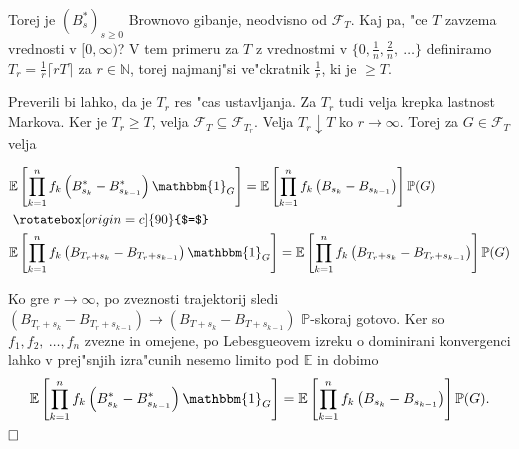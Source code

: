 \documentclass[twoside,11pt]{article}
\begin{document}
\begin{dokaz}
\begin{enumerate}
    \end{enumerate}
    Torej je $(B^*_s)_{s\geq0}$ Brownovo gibanje, neodvisno od $\mathcal{F}_T$.
    \noindent
    Kaj pa, "ce $T$ zavzema vrednosti v $[0, \infty)$? V tem primeru za $T$ z vrednostmi v $\{0, \tfrac{1}{n}, \tfrac{2}{n}, \ \ldots \}$
    definiramo $T_r = \tfrac{1}{r}\lceil rT\rceil$ za $r\in\mathbb{N}$, torej najmanj"si ve"ckratnik $\tfrac{1}{r}$, ki je $ \geq T$.

    \begin{figure}[h]
        \centering
    \end{figure}
    
   
    \noindent
     Preverili bi lahko, da je $T_r$ res "cas ustavljanja. Za $T_r$ tudi velja krepka lastnost Markova. Ker je $T_r \geq T$, velja $\mathcal{F}_{T} \subseteq \mathcal{F}_{T_r}$. Velja $T_r \downarrow T$ ko $r \rightarrow \infty$. Torej za $G \in \mathcal{F}_T$ velja

     \begin{align*}
        &\mathbb{E}\left[\prod_{k=1}^nf_k\left(B^*_{s_k} - B^*_{s_{k-1}}\right)\mathbbm{1}_G\right] = \mathbb{E}\left[\prod_{k=1}^nf_k\left(B_{s_k} - B_{s_{k-1}}\right)\right]\mathbb{P}(G) \\
        &\mathrel{\rotatebox[origin=c]{90}{$=$}} \\
        &\mathbb{E}\left[\prod_{k=1}^nf_k\left(B_{T_r +s_k} - B_{T_r + s_{k-1}}\right)\mathbbm{1}_G\right] = \mathbb{E}\left[\prod_{k=1}^nf_k\left(B_{T_r + s_k} - B_{T_r + s_{k-1}}\right)\right]\mathbb{P}(G)
    \end{align*}

    \noindent
    Ko gre $r \rightarrow \infty$, po zveznosti trajektorij sledi $(B_{T_r + s_k} - B_{T_r + s_{k-1}}) \rightarrow (B_{T + s_k} - B_{T + s_{k-1}})$ $\mathbb{P}$-skoraj gotovo. Ker so $f_1, f_2, \ \dots, f_n$  zvezne in omejene, po  Lebesgueovem izreku o dominirani konvergenci lahko v prej"snjih izra"cunih nesemo limito pod $\mathbb{E}$ in dobimo
    $$
        \mathbb{E}\left[\prod_{k=1}^nf_k\left(B^*_{s_k} - B^*_{s_{k-1}}\right)\mathbbm{1}_G\right] = \mathbb{E}\left[\prod_{k=1}^nf_k\left(B_{s_k} - B_{s_{k-1}}\right)\right]\mathbb{P}(G).
    $$
     $\hfill \square$
\end{dokaz}
\end{document}
